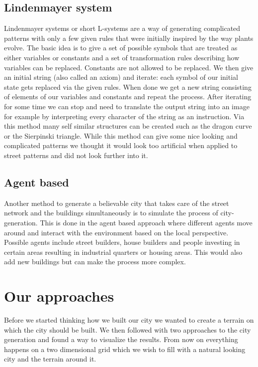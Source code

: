 \documentclass{scrartcl}
\begin{document}
\subsection{Lindenmayer system}
Lindenmayer systems or short L-systems are a way of generating complicated patterns
with only a few given rules that were initially inspired by the way plants evolve.
The basic idea is to give a set of possible symbols that are treated as either variables
or constants and a set of transformation rules describing how variables can be replaced.
Constants are not allowed to be replaced. We then give an initial string (also
called an axiom) and iterate: each symbol of our initial state gets replaced via the given rules.
When done we get a new string consisting of elements of our variables and constants
and repeat the process. After iterating for some time we can stop and need to
translate the output string into an image for example by interpreting every character
of the string as an instruction. Via this method many self similar
structures can be created such as the dragon curve or the Sierpinski triangle.
While this method can give some nice looking and complicated patterns we thought
it would look too artificial when applied to street patterns and did not look further
into it.


\subsection{Agent based}
Another method to generate a believable city that takes care of the street network
and the buildings simultaneously is to simulate the process of
city-generation. This is done in the agent based approach where different agents
move around and interact with the environment based on the local perspective.
Possible agents include street builders, house builders and people investing in certain
areas resulting in industrial quarters or housing areas. This would also add new
buildings but can make the process more complex.



\section{Our approaches}
Before we started thinking how we built our city we wanted to create a terrain
on which the city should be built. We then followed with two approaches to the
city generation and found a way to visualize the results.
From now on everything happens on a two dimensional grid which we wish to fill
with a natural looking city and the terrain around it.
\end{document}
